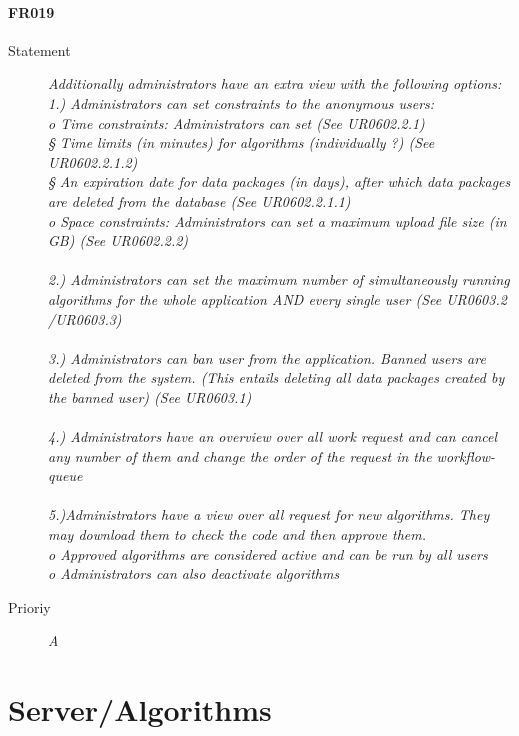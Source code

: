 \paragraph{FR019}
\begin{description}
  \item [Statement]
    \textit{
Additionally administrators have an extra view with the following options:
\\1.) Administrators can set constraints to the anonymous users:
\\o   Time constraints: Administrators can set (See UR0602.2.1)
\\§  Time limits (in minutes) for algorithms (individually ?) (See UR0602.2.1.2)
\\§  An expiration date for data packages (in days), after which data packages are deleted from the database (See UR0602.2.1.1)
\\o   Space constraints: Administrators can set a maximum upload file size (in GB) (See UR0602.2.2)
\\
\\2.) Administrators can  set the maximum number of simultaneously running algorithms for the whole application AND every single user (See UR0603.2 /UR0603.3)
\\
\\3.) Administrators can ban user from the application. Banned users are deleted from the system. (This entails deleting all data packages created by the banned user) (See UR0603.1)
\\
\\4.) Administrators have an overview over all work request and can cancel any number of them and change the order of the request in the workflow-queue
\\
\\5.)Administrators have a view over all request for new algorithms. They may download them to check the code and then approve them.
\\o   Approved algorithms are considered active and can be run by all users
\\o   Administrators can also deactivate algorithms
}
  \item [Prioriy] \textit{A}
\end{description}

\section{Server/Algorithms}


